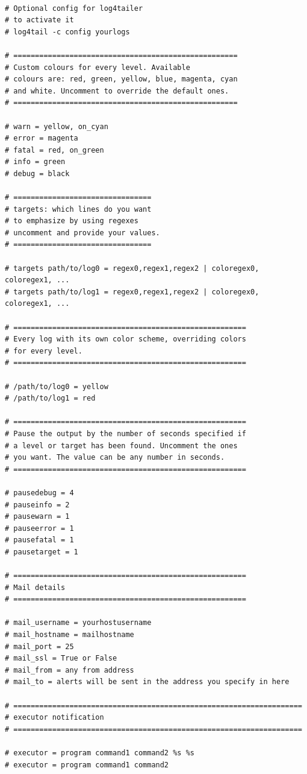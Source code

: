 \begin{verbatim}

# Optional config for log4tailer
# to activate it
# log4tail -c config yourlogs

# ====================================================
# Custom colours for every level. Available 
# colours are: red, green, yellow, blue, magenta, cyan 
# and white. Uncomment to override the default ones.
# ====================================================

# warn = yellow, on_cyan
# error = magenta 
# fatal = red, on_green
# info = green
# debug = black

# ================================
# targets: which lines do you want 
# to emphasize by using regexes
# uncomment and provide your values.
# ================================

# targets path/to/log0 = regex0,regex1,regex2 | coloregex0, coloregex1, ...
# targets path/to/log1 = regex0,regex1,regex2 | coloregex0, coloregex1, ...

# ======================================================
# Every log with its own color scheme, overriding colors 
# for every level.
# ======================================================

# /path/to/log0 = yellow
# /path/to/log1 = red

# ======================================================
# Pause the output by the number of seconds specified if 
# a level or target has been found. Uncomment the ones 
# you want. The value can be any number in seconds. 
# ======================================================

# pausedebug = 4
# pauseinfo = 2
# pausewarn = 1
# pauseerror = 1
# pausefatal = 1
# pausetarget = 1

# ======================================================
# Mail details 
# ======================================================

# mail_username = yourhostusername
# mail_hostname = mailhostname
# mail_port = 25
# mail_ssl = True or False
# mail_from = any from address
# mail_to = alerts will be sent in the address you specify in here

# ===================================================================
# executor notification
# ===================================================================

# executor = program command1 command2 %s %s
# executor = program command1 command2 


\end{verbatim}
